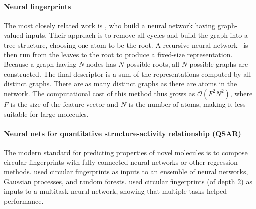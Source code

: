 \documentclass{article}
\begin{document}
\paragraph{Neural fingerprints}
The most closely related work is \citet{lusci2013deep}, who build a neural network having graph-valued inputs.
Their approach is to remove all cycles and build the graph into a tree structure, choosing one atom to be the root.
A recursive neural network~\citep{socher2011dynamic, socher2011semi} is then run from the leaves to the root to produce a fixed-size representation.
Because a graph having $N$ nodes has $N$ possible roots, all $N$ possible graphs are constructed.
The final descriptor is a sum of the representations computed by all distinct graphs.
There are as many distinct graphs as there are atoms in the network.
The computational cost of this method thus grows as $\mathcal{O}(F^2N^2)$, where $F$ is the size of the feature vector and $N$ is the number of atoms, making it less suitable for large molecules.

\paragraph{Neural nets for quantitative structure-activity relationship (QSAR)}
The modern standard for predicting properties of novel molecules is to compose circular fingerprints with fully-connected neural networks or other regression methods.
\cite{dahl2014multi} used circular fingerprints as inputs to an ensemble of neural networks, Gaussian processes, and random forests.
\cite{ramsundar2015massively} used circular fingerprints (of depth 2) as inputs to a multitask neural network, showing that multiple tasks helped performance.

\end{document}
